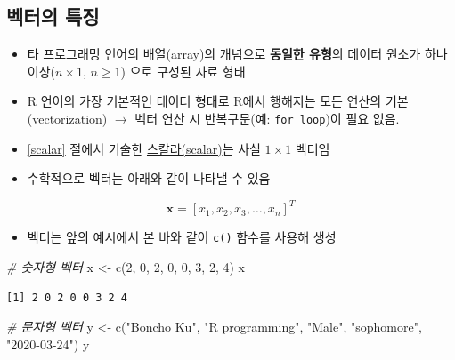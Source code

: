 \documentclass[
  11pt,
]{krantz}
\newenvironment{Shaded}{\begin{snugshade}}{\end{snugshade}}
\newcommand{\CommentTok}[1]{\textcolor[rgb]{0.37,0.37,0.37}{\textit{#1}}}
\newcommand{\DecValTok}[1]{\textcolor[rgb]{0.06,0.06,0.06}{#1}}
\newcommand{\FunctionTok}[1]{\textcolor[rgb]{0,0,0}{#1}}
\newcommand{\NormalTok}[1]{#1}
\newcommand{\OtherTok}[1]{\textcolor[rgb]{0.37,0.37,0.37}{#1}}
\newcommand{\StringTok}[1]{\textcolor[rgb]{0.5,0.5,0.5}{#1}}
\providecommand{\tightlist}{%
  \setlength{\itemsep}{0pt}\setlength{\parskip}{0pt}}
\begin{document}
\hypertarget{vector-prop}{%
\subsection{벡터의 특징}\label{vector-prop}}

\begin{itemize}
\tightlist
\item
  타 프로그래밍 언어의 배열(array)의 개념으로 \textbf{동일한 유형}의 데이터 원소가 하나 이상(\(n \times 1\), \(n \geq 1\)) 으로 구성된 자료 형태
\item
  R 언어의 가장 기본적인 데이터 형태로 R에서 행해지는 모든 연산의 기본(vectorization) \(\rightarrow\) 벡터 연산 시 반복구문(예: \texttt{for\ loop})이 필요 없음.
\item
  \ref{scalar} 절에서 기술한 \protect\hyperlink{scalar}{스칼라(scalar)}는 사실 \(1 \times 1\) 벡터임
\item
  수학적으로 벡터는 아래와 같이 나타낼 수 있음
\end{itemize}

\[\mathrm{\mathbf x} = [x_1, x_2, x_3, \ldots, x_n]^T
\]

\begin{itemize}
\tightlist
\item
  벡터는 앞의 예시에서 본 바와 같이 \texttt{c()} 함수를 사용해 생성
\end{itemize}

\footnotesize

\begin{Shaded}
\begin{Highlighting}[]
\CommentTok{\# 숫자형 벡터 }
\NormalTok{x }\OtherTok{\textless{}{-}} \FunctionTok{c}\NormalTok{(}\DecValTok{2}\NormalTok{, }\DecValTok{0}\NormalTok{, }\DecValTok{2}\NormalTok{, }\DecValTok{0}\NormalTok{, }\DecValTok{0}\NormalTok{, }\DecValTok{3}\NormalTok{, }\DecValTok{2}\NormalTok{, }\DecValTok{4}\NormalTok{)}
\NormalTok{x}
\end{Highlighting}
\end{Shaded}

\begin{verbatim}
[1] 2 0 2 0 0 3 2 4
\end{verbatim}

\begin{Shaded}
\begin{Highlighting}[]
\CommentTok{\# 문자형 벡터}
\NormalTok{y }\OtherTok{\textless{}{-}} \FunctionTok{c}\NormalTok{(}\StringTok{"Boncho Ku"}\NormalTok{, }\StringTok{"R programming"}\NormalTok{, }\StringTok{"Male"}\NormalTok{, }\StringTok{"sophomore"}\NormalTok{, }\StringTok{"2020{-}03{-}24"}\NormalTok{)}
\NormalTok{y}
\end{Highlighting}
\end{Shaded}
\end{document}
